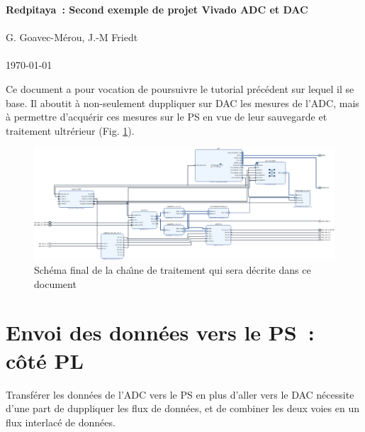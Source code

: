 \documentclass[12pt,oneside]{article}
\begin{document}
\begin{center}
{\bf \Large Redpitaya~: Second exemple de projet Vivado ADC et DAC} \\ \ \\
G. Goavec-M\'erou, J.-M Friedt \\ \ \\ \today
\end{center}

Ce document a pour vocation de poursuivre le tutorial pr\'ec\'edent sur lequel il se base. Il
aboutit \`a non-seulement duppliquer sur DAC les mesures de l'ADC, mais \`a permettre
d'acqu\'erir ces mesures sur le PS en vue de leur sauvegarde et traitement ultr\'erieur
(Fig. \ref{fin}).

\begin{figure}[h!tb]
\hspace*{-1cm}\includegraphics[width=1.2\linewidth]{design_1.pdf}
\caption{Sch\'ema final de la cha\^\i ne de traitement qui sera d\'ecrite dans ce document}
\label{fin}
\end{figure}

\section{Envoi des donn\'ees vers le PS~: c\^ot\'e PL}

Transf\'erer les donn\'ees de l'ADC vers le PS en plus d'aller vers le DAC
n\'ecessite d'une part de duppliquer les flux de donn\'ees, et de combiner
les deux voies en un flux interlac\'e de donn\'ees.
\end{document}
